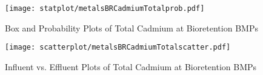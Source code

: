         \begin{figure}[hb]   %
            \centering
            \texttt{[image: statplot/metalsBRCadmiumTotalprob.pdf]}
            \caption{Box and Probability Plots of Total Cadmium at Bioretention BMPs}
        \end{figure}         %
        
        
        \begin{figure}[hb]   %
            \centering
            \texttt{[image: scatterplot/metalsBRCadmiumTotalscatter.pdf]}
            \caption{Influent vs. Effluent Plots of Total Cadmium at Bioretention BMPs}
        \end{figure}         %
        \clearpage
        
